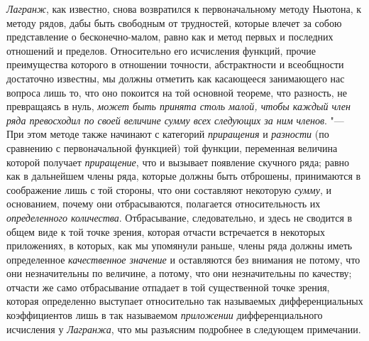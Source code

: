 {\em Лагранж}, как известно, снова возвратился к
первоначальному методу Ньютона, к методу рядов, дабы быть свободным от
трудностей, которые влечет за собою представление о бесконечно-малом, равно
как и метод первых и последних отношений и пределов. Относительно его
исчисления функций, прочие преимущества которого в отношении точности,
абстрактности и всеобщности достаточно известны, мы должны отметить как
касающееся занимающего нас вопроса лишь то, что оно покоится на той
основной теореме, что разность, не превращаясь в нуль,
{\em может быть принята столь малой, чтобы каждый член
ряда превосходил по своей величине сумму всех следующих за ним членов}. "---
При этом методе также начинают с категорий
{\em приращения} и {\em разности}
(по сравнению с первоначальной функцией) той функции, переменная величина
которой получает {\em приращение}, что и вызывает
появление скучного ряда; равно как в дальнейшем члены ряда, которые должны
быть отброшены, принимаются в соображение лишь с той стороны, что они
составляют некоторую {\em сумму}, и основанием, почему
они отбрасываются, полагается относительность их
{\em определенного количества}. Отбрасывание,
следовательно, и здесь не сводится в общем виде к той точке зрения, которая
отчасти встречается в некоторых приложениях, в которых, как мы упомянули
раньше, члены ряда должны иметь определенное
{\em качественное значение} и оставляются без внимания
не потому, что они незначительны по величине, а потому, что они
незначительны по качеству; отчасти же само отбрасывание отпадает в той
существенной точке зрения, которая определенно выступает относительно так
называемых дифференциальных коэффициентов лишь в так называемом
{\em приложении} дифференциального исчисления у
{\em Лагранжа}, что мы разъясним подробнее в следующем
примечании.

